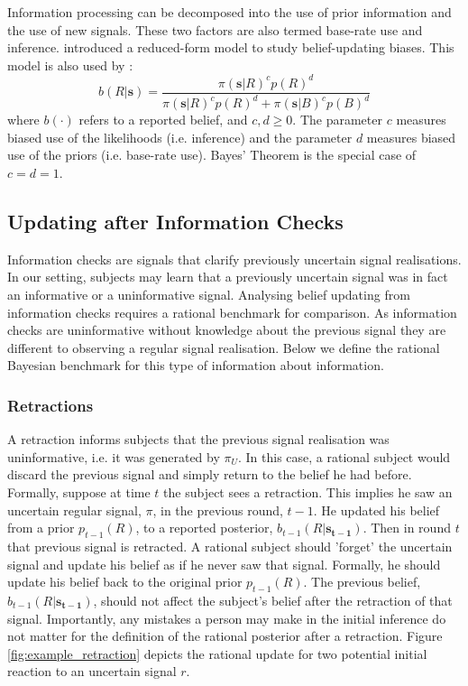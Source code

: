 \documentclass{article}
\begin{document}
Information processing can be decomposed into the use of prior information and the use of new signals. These two factors are also termed base-rate use and inference. \cite{Grether1980} introduced a reduced-form model to study belief-updating biases. This model is also used by \cite{Benjamin2019}:
\begin{equation}
\label{eq-benjamin}
b(R|\mathbf{s})=\frac{\pi(\mathbf{s}|R)^c p(R)^d}{\pi(\mathbf{s}|R)^c p(R)^d + \pi(\mathbf{s}|B)^c p(B)^d}    
\end{equation}
where $b(\cdot)$ refers to a reported belief, and $c,d\geq 0$. The parameter $c$ measures biased use of the likelihoods (i.e. inference) and the parameter $d$ measures biased use of the priors (i.e. base-rate use). Bayes' Theorem is the special case of $c=d=1$.

\subsection{Updating after Information Checks}

Information checks are signals that clarify previously uncertain signal realisations. In our setting, subjects may learn that a previously uncertain signal was in fact an informative or a uninformative signal. Analysing belief updating from information checks requires a rational benchmark for comparison. As information checks are uninformative without knowledge about the previous signal they are different to observing a regular signal realisation. Below we define the rational Bayesian benchmark for this type of information about information.

\subsubsection*{Retractions}
A retraction informs subjects that the previous signal realisation was uninformative, i.e. it was generated by $\pi_U$. In this case, a rational subject would discard the previous signal and simply return to the belief he had before. Formally, suppose at time $t$ the subject sees a retraction. This implies he saw an uncertain regular signal, $\pi$, in the previous round, $t-1$. He updated his belief from a prior $p_{t-1}(R)$, to a reported posterior, $b_{t-1}(R|\mathbf{s_{t-1}})$. Then in round $t$ that previous signal is retracted. A rational subject should 'forget' the uncertain signal and update his belief as if he never saw that signal. Formally, he should update his belief back to the original prior $p_{t-1}(R)$. The previous belief, $b_{t-1}(R|\mathbf{s_{t-1}})$, should not affect the subject's belief after the retraction of that signal. Importantly, any mistakes a person may make in the initial inference do not matter for the definition of the rational posterior after a retraction. Figure \ref{fig:example_retraction} depicts the rational update for two potential initial reaction to an uncertain signal $r$.
\end{document}
